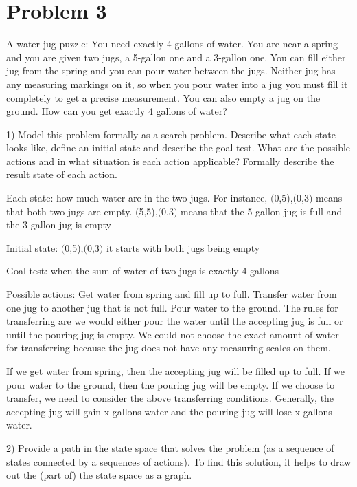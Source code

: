 \documentclass[11pt]{article}
\begin{document}
\section*{Problem 3} 


A water jug puzzle: You need exactly 4 gallons of water. You are near a spring and you are given two jugs, a 5-gallon one and a 3-gallon one. You can fill either jug from the spring and you can pour water between the jugs. Neither jug has any measuring markings on it, so when you pour water into a jug you must fill it completely to get a precise measurement. You can also empty a jug on the ground. How can you get exactly 4 gallons of water?

1) Model this problem formally as a search problem. Describe what each state looks like, define an initial state and describe the goal test. What are the possible actions and in what situation is each action applicable? Formally describe the result state of each action.

Each state: how much water are in the two jugs. For instance, $($0,5),$($0,3$)$ means that both two jugs are empty. $($5,5),$($0,3$)$ means that the 5-gallon jug is full and the 3-gallon jug is empty \newline

Initial state: $($0,5),$($0,3$)$ it starts with both jugs being empty \newline

Goal test: when the sum of water of two jugs is exactly 4 gallons \newline

Possible actions: Get water from spring and fill up to full. Transfer water from one jug to another jug that is not full. Pour water to the ground. The rules for transferring are we would either pour the water until the accepting jug is full or until the pouring jug is empty. We could not choose the exact amount of water for transferring because the jug does not have any measuring scales on them. \newline

If we get water from spring, then the accepting jug will be filled up to full. If we pour water to the ground, then the pouring jug will be empty. If we choose to transfer, we need to consider the above transferring conditions. Generally, the accepting jug will gain x gallons water and the pouring jug will lose x gallons water. \newline


2) Provide a path in the state space that solves the problem (as a sequence of states connected by a sequences of actions). To find this solution, it helps to draw out the (part of) the state space as a graph.
\newline
\end{document}

